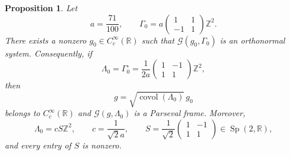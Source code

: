 \documentclass[11pt,reqno]{amsart}
\numberwithin{equation}{section}
\newtheorem{proposition}[theorem]{Proposition}
\theoremstyle{definition}
\theoremstyle{remark}
\newcommand{\R}{\mathbb R}
\newcommand{\Z}{\mathbb Z}
\newcommand{\covol}{\operatorname{covol}}
\newcommand{\G}{\mathcal G}
\newcommand{\Sp}{\operatorname{Sp}}
\begin{document}
\begin{proposition}\label{prop:compact-parseval-example}
Let
\[
 a=\frac{71}{100},
 \qquad
 \Gamma_0=a\begin{pmatrix}1&1\\-1&1\end{pmatrix}\Z^2.
\]
There exists a nonzero $g_0\in C_c^\infty(\R)$ such that
$\G(g_0,\Gamma_0)$ is an orthonormal system.  Consequently, if
\[
 \Lambda_0=\Gamma_0^\circ
 =\frac1{2a}\begin{pmatrix}1&-1\\1&1\end{pmatrix}\Z^2,
\]
then
\[
 g=\sqrt{\covol(\Lambda_0)}\,g_0
\]
belongs to $C_c^\infty(\R)$ and $\G(g,\Lambda_0)$ is a Parseval frame.
Moreover,
\[
 \Lambda_0=cS\Z^2,
 \qquad
 c=\frac1{\sqrt2a},
 \qquad
 S=\frac1{\sqrt2}\begin{pmatrix}1&-1\\1&1\end{pmatrix}\in\Sp(2,\R),
\]
and every entry of $S$ is nonzero.
\end{proposition}
\end{document}
